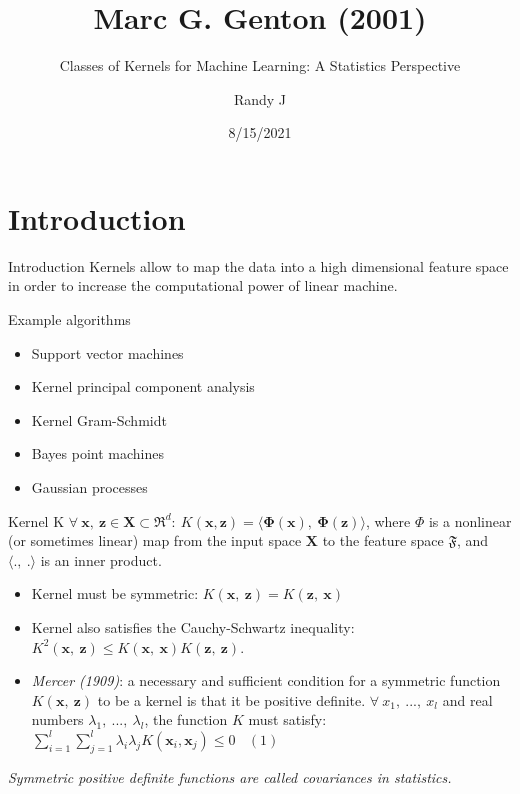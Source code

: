 \documentclass[
  ignorenonframetext,
]{beamer}
\title{Marc G. Genton (2001)}
\subtitle{Classes of Kernels for Machine Learning: A Statistics
Perspective}
\author{Randy J}
\date{8/15/2021}
\providecommand{\tightlist}{%
  \setlength{\itemsep}{0pt}\setlength{\parskip}{0pt}}
\begin{document}
\frame{\titlepage}

\begin{frame}[allowframebreaks]
  \tableofcontents[hideallsubsections]
\end{frame}
\hypertarget{introduction}{%
\section{Introduction}\label{introduction}}

\begin{frame}{Introduction}
\protect\hypertarget{introduction-1}{}
Kernels allow to map the data into a high dimensional feature space in
order to increase the computational power of linear machine.

Example algorithms

\begin{itemize}
\tightlist
\item
  Support vector machines
\item
  Kernel principal component analysis
\item
  Kernel Gram-Schmidt
\item
  Bayes point machines
\item
  Gaussian processes
\end{itemize}
\end{frame}

\begin{frame}{Kernel K}
\protect\hypertarget{kernel-k}{}
\(\forall\ \pmb x,\ \pmb z \in \pmb X \subset \mathfrak R^d: \ K(\pmb x, \pmb z) = \langle \pmb\Phi(\pmb x),\ \pmb\Phi(\pmb z)\rangle\),
where \(\Phi\) is a nonlinear (or sometimes linear) map from the input
space \(\pmb X\) to the feature space \(\mathfrak F\), and
\(\langle .,\ .\rangle\) is an inner product.

\begin{itemize}
\item
  Kernel must be symmetric: \(K(\pmb x,\ \pmb z) = K(\pmb z,\ \pmb x)\)
\item
  Kernel also satisfies the Cauchy-Schwartz inequality:
  \(K^2(\pmb x,\ \pmb z) \leq K(\pmb x,\ \pmb x)K(\pmb z,\ \pmb z)\).
\item
  \emph{Mercer (1909)}: a necessary and sufficient condition for a
  symmetric function \(K(\pmb x,\ \pmb z)\) to be a kernel is that it be
  positive definite. \(\forall\ x_1,\ ... ,\ x_l\) and real numbers
  \(\lambda_1,\ ... ,\ \lambda_l\), the function \(K\) must satisfy:
  \(\sum_{i=1}^l \sum_{j=1}^l \lambda_i \lambda_j K(\pmb x_i, \pmb x_j) \leq 0 \ \ \ \ (1)\)
\end{itemize}

\emph{Symmetric positive definite functions are called covariances in
statistics.}
\end{frame}
\end{document}
